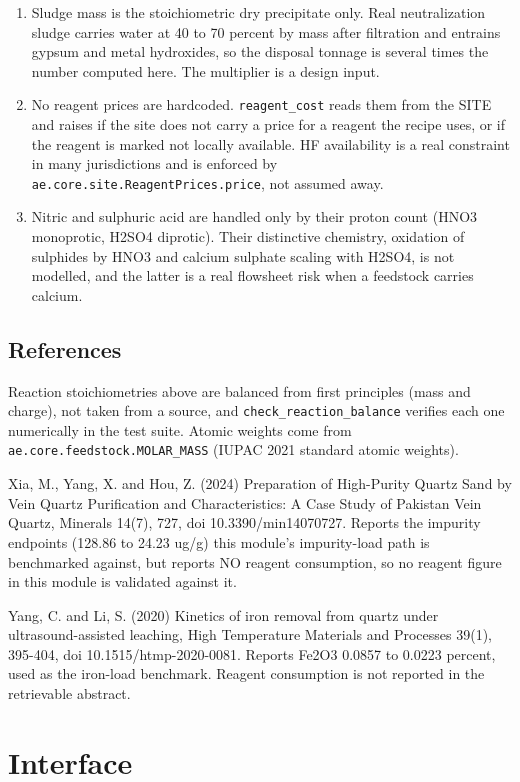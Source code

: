 \documentclass[10pt,a4paper,twoside]{report}
\begin{document}
\begin{enumerate}[leftmargin=*,label=\arabic*.]
\item Sludge mass is the stoichiometric dry precipitate only. Real neutralization sludge carries water at 40 to 70 percent by mass after filtration and entrains gypsum and metal hydroxides, so the disposal tonnage is several times the number computed here. The multiplier is a design input.
\item No reagent prices are hardcoded. \texttt{reagent\_cost} reads them from the SITE and raises if the site does not carry a price for a reagent the recipe uses, or if the reagent is marked not locally available. HF availability is a real constraint in many jurisdictions and is enforced by \texttt{ae.core.site.ReagentPrices.price}, not assumed away.
\item Nitric and sulphuric acid are handled only by their proton count (HNO3 monoprotic, H2SO4 diprotic). Their distinctive chemistry, oxidation of sulphides by HNO3 and calcium sulphate scaling with H2SO4, is not modelled, and the latter is a real flowsheet risk when a feedstock carries calcium.
\end{enumerate}

\subsection*{References}

Reaction stoichiometries above are balanced from first principles (mass and charge), not taken from a source, and \texttt{check\_reaction\_balance} verifies each one numerically in the test suite. Atomic weights come from \texttt{ae.core.feedstock.MOLAR\_MASS} (IUPAC 2021 standard atomic weights).

Xia, M., Yang, X. and Hou, Z. (2024) Preparation of High-Purity Quartz Sand by Vein Quartz Purification and Characteristics: A Case Study of Pakistan Vein Quartz, Minerals 14(7), 727, doi 10.3390/min14070727. Reports the impurity endpoints (128.86 to 24.23 ug/g) this module's impurity-load path is benchmarked against, but reports NO reagent consumption, so no reagent figure in this module is validated against it.

Yang, C. and Li, S. (2020) Kinetics of iron removal from quartz under ultrasound-assisted leaching, High Temperature Materials and Processes 39(1), 395-404, doi 10.1515/htmp-2020-0081. Reports Fe2O3 0.0857 to 0.0223 percent, used as the iron-load benchmark. Reagent consumption is not reported in the retrievable abstract.

\section{Interface}
\end{document}
